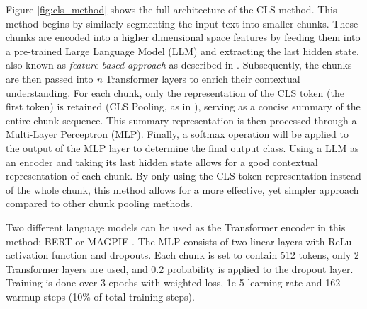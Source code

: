 Figure \ref{fig:cls_method} shows the full architecture of the CLS method. This method begins by similarly segmenting the input text into smaller chunks. These chunks are encoded into a higher dimensional space features by feeding them into a pre-trained Large Language Model (LLM) and extracting the last hidden state, also known as \textit{feature-based approach} as described in \cite{sun-2020-fine-tune}. Subsequently, the chunks are then passed into \textit{n} Transformer layers to enrich their contextual understanding. For each chunk, only the representation of the CLS token (the first token) is retained (CLS Pooling, as in \cite{su-2021-classifying}), serving as a concise summary of the entire chunk sequence. This summary representation is then processed through a Multi-Layer Perceptron (MLP). Finally, a softmax operation will be applied to the output of the MLP layer to determine the final output class. Using a LLM as an encoder and taking its last hidden state allows for a good contextual representation of each chunk. By only using the CLS token representation instead of the whole chunk, this method allows for a more effective, yet simpler approach compared to other chunk pooling methods.

Two different language models can be used as the Transformer encoder in this method: BERT \cite{devlin-2019-bert} or MAGPIE \cite{horych-2024-magpie}. The MLP consists of two linear layers with ReLu activation function \cite{agarap-2018-relu} and dropouts. Each chunk is set to contain 512 tokens, only 2 Transformer layers are used, and 0.2 probability is applied to the dropout layer. Training is done over 3 epochs with weighted loss, 1e-5 learning rate and 162 warmup steps (10\% of total training steps).


